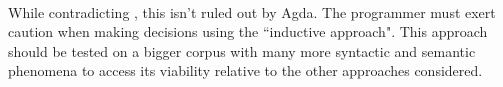 \begin{code}%
\>[0]\<%
\\
\>[0][@{}l@{\AgdaIndent{0}}]%
\>[2]\AgdaSpace{}%
\AgdaSymbol{:}\AgdaSpace{}%
\AgdaSpace{}%
\<%
\\
%
\>[2]\AgdaSpace{}%
\AgdaSymbol{=}\AgdaSpace{}%
\AgdaSpace{}%
\AgdaSymbol{\{}\AgdaSpace{}%
\AgdaSpace{}%
\AgdaSymbol{=}\AgdaSpace{}%
\AgdaSpace{}%
\AgdaSymbol{\}}\<%
\\
\>[2][@{}l@{\AgdaIndent{0}}]%
\>[4]\<%
\\
\>[4][@{}l@{\AgdaIndent{0}}]%
\>[6]\AgdaSpace{}%
\AgdaSymbol{:}\AgdaSpace{}%
\AgdaSpace{}%
\AgdaSpace{}%
\<%
\\
%
\>[6]\AgdaSpace{}%
\AgdaSpace{}%
\AgdaSymbol{=}\AgdaSpace{}%
\<%
\\
%
\>[6]\AgdaSpace{}%
\AgdaSpace{}%
\AgdaSymbol{=}\AgdaSpace{}%
\<%
\end{code}

While contradicting , this isn't ruled out by Agda. The
programmer must exert caution when making decisions using the ``inductive
approach". This approach should be tested on a bigger corpus with many more
syntactic and semantic phenomena to access its viability relative to the other
approaches considered.
